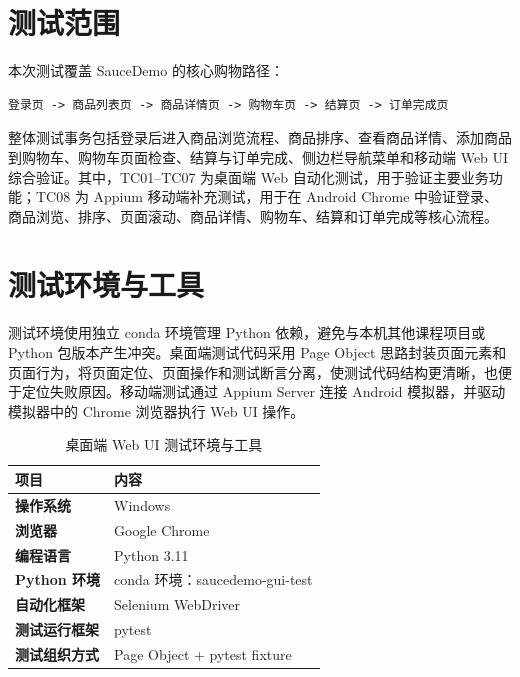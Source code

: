 \documentclass[UTF8,a4paper,12pt]{ctexart}
\begin{document}
\section{测试范围}

本次测试覆盖 SauceDemo 的核心购物路径：

\begin{lstlisting}
登录页 -> 商品列表页 -> 商品详情页 -> 购物车页 -> 结算页 -> 订单完成页
\end{lstlisting}

整体测试事务包括登录后进入商品浏览流程、商品排序、查看商品详情、添加商品到购物车、购物车页面检查、结算与订单完成、侧边栏导航菜单和移动端 Web UI 综合验证。其中，TC01--TC07 为桌面端 Web 自动化测试，用于验证主要业务功能；TC08 为 Appium 移动端补充测试，用于在 Android Chrome 中验证登录、商品浏览、排序、页面滚动、商品详情、购物车、结算和订单完成等核心流程。

\section{测试环境与工具}

测试环境使用独立 conda 环境管理 Python 依赖，避免与本机其他课程项目或 Python 包版本产生冲突。桌面端测试代码采用 Page Object 思路封装页面元素和页面行为，将页面定位、页面操作和测试断言分离，使测试代码结构更清晰，也便于定位失败原因。移动端测试通过 Appium Server 连接 Android 模拟器，并驱动模拟器中的 Chrome 浏览器执行 Web UI 操作。

\begin{table}[H]
\centering
\caption{桌面端 Web UI 测试环境与工具}
\begin{tabularx}{\textwidth}{>{\bfseries}p{3.2cm}X}
\toprule
项目 & 内容 \\
\midrule
操作系统 & Windows \\
浏览器 & Google Chrome \\
编程语言 & Python 3.11 \\
Python 环境 & conda 环境：saucedemo-gui-test \\
自动化框架 & Selenium WebDriver \\
测试运行框架 & pytest \\
测试组织方式 & Page Object + pytest fixture \\
\bottomrule
\end{tabularx}
\end{table}
\end{document}
